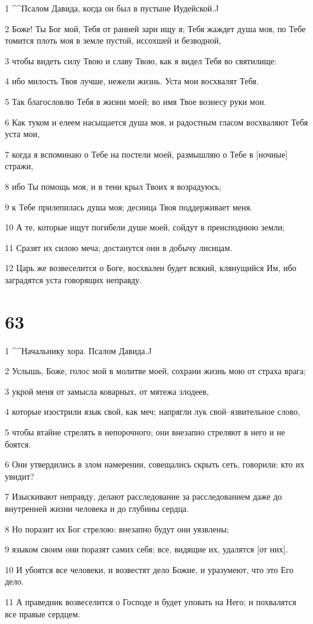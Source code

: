 \par 1 ^^Псалом Давида, когда он был в пустыне Иудейской.^^
\par 2 Боже! Ты Бог мой, Тебя от ранней зари ищу я; Тебя жаждет душа моя, по Тебе томится плоть моя в земле пустой, иссохшей и безводной,
\par 3 чтобы видеть силу Твою и славу Твою, как я видел Тебя во святилище:
\par 4 ибо милость Твоя лучше, нежели жизнь. Уста мои восхвалят Тебя.
\par 5 Так благословлю Тебя в жизни моей; во имя Твое вознесу руки мои.
\par 6 Как туком и елеем насыщается душа моя, и радостным гласом восхваляют Тебя уста мои,
\par 7 когда я вспоминаю о Тебе на постели моей, размышляю о Тебе в [ночные] стражи,
\par 8 ибо Ты помощь моя, и в тени крыл Твоих я возрадуюсь;
\par 9 к Тебе прилепилась душа моя; десница Твоя поддерживает меня.
\par 10 А те, которые ищут погибели душе моей, сойдут в преисподнюю земли;
\par 11 Сразят их силою меча; достанутся они в добычу лисицам.
\par 12 Царь же возвеселится о Боге, восхвален будет всякий, клянущийся Им, ибо заградятся уста говорящих неправду.

\chapter{63}

\par 1 ^^Начальнику хора. Псалом Давида.^^
\par 2 Услышь, Боже, голос мой в молитве моей, сохрани жизнь мою от страха врага;
\par 3 укрой меня от замысла коварных, от мятежа злодеев,
\par 4 которые изострили язык свой, как меч; напрягли лук свой--язвительное слово,
\par 5 чтобы втайне стрелять в непорочного; они внезапно стреляют в него и не боятся.
\par 6 Они утвердились в злом намерении, совещались скрыть сеть, говорили: кто их увидит?
\par 7 Изыскивают неправду, делают расследование за расследованием даже до внутренней жизни человека и до глубины сердца.
\par 8 Но поразит их Бог стрелою: внезапно будут они уязвлены;
\par 9 языком своим они поразят самих себя; все, видящие их, удалятся [от них].
\par 10 И убоятся все человеки, и возвестят дело Божие, и уразумеют, что это Его дело.
\par 11 А праведник возвеселится о Господе и будет уповать на Него; и похвалятся все правые сердцем.


